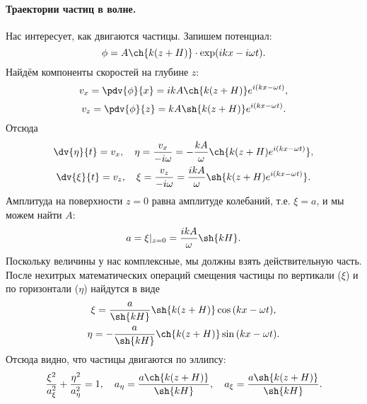 \paragraph{Траектории частиц в волне. } Нас интересует, как двигаются частицы. Запишем потенциал:
\begin{equation}
	\phi=A\ch{k(z+H)}\cdot\exp(ikx-i\omega t).
\end{equation}
Найдём компоненты скоростей на глубине $z$:
\begin{equation}
    v_x = \pdv{\phi}{x} = ikA\ch{k(z+H)}e^{i(kx-\omega t)},
\end{equation}
\begin{equation}
    v_z = \pdv{\phi}{z} = kA\sh{k(z+H)}e^{i(kx-\omega t)}.
\end{equation}
Отсюда
\begin{multline}
    \dv{\eta}{t} = v_x, \quad \eta=\frac{v_x}{-i\omega} = -\frac{kA}{\omega}\ch{k(z+H) e^{i(kx-\omega t)} },\\
    \dv{\xi}{t} = v_z, \quad \xi=\frac{v_z}{-i\omega} = \frac{ikA}{\omega}\sh{k(z+H) e^{i(kx-\omega t)} }.
\end{multline}
Амплитуда на поверхности $z = 0$ равна амплитуде колебаний, т.е. $\xi = a$, и мы можем найти $A$:
\begin{equation}
    a = \xi|_{z = 0} = \frac{ikA}{\omega}\sh{kH}.
\end{equation}
Поскольку величины у нас комплексные, мы должны взять действительную часть. После нехитрых математических операций смещения частицы по вертикали ($\xi$) и по горизонтали ($\eta$) найдутся в виде
\begin{multline}
    \xi = \frac{a}{\sh{kH}}\sh{k(z+H)}\cos{(kx-\omega t)},\\
    \eta = -\frac{a}{\sh{kH}}\ch{k(z+H)}\sin{(kx-\omega t)}.
\end{multline}
Отсюда видно, что частицы двигаются по эллипсу:
\begin{equation}
    \label{eq:ellipse3}
    \frac{\xi^2}{a_\xi^2}+\frac{\eta^2}{a_\eta^2} = 1,
    \quad a_\eta = \frac{a\ch{k(z+H)}}{\sh{kH}}
    , \quad a_\xi = \frac{a\sh{k(z+H)}}{\sh{kH}}.
\end{equation}


